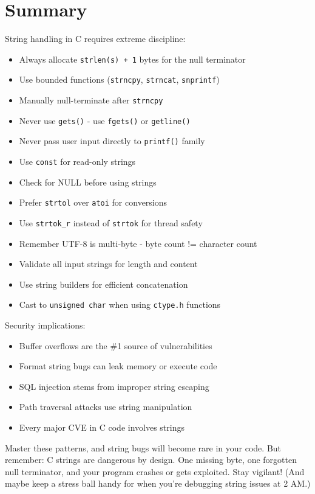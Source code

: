 \section{Summary}

String handling in C requires extreme discipline:

\begin{itemize}
    \item Always allocate \texttt{strlen(s) + 1} bytes for the null terminator
    \item Use bounded functions (\texttt{strncpy}, \texttt{strncat}, \texttt{snprintf})
    \item Manually null-terminate after \texttt{strncpy}
    \item Never use \texttt{gets()} - use \texttt{fgets()} or \texttt{getline()}
    \item Never pass user input directly to \texttt{printf()} family
    \item Use \texttt{const} for read-only strings
    \item Check for NULL before using strings
    \item Prefer \texttt{strtol} over \texttt{atoi} for conversions
    \item Use \texttt{strtok\_r} instead of \texttt{strtok} for thread safety
    \item Remember UTF-8 is multi-byte - byte count != character count
    \item Validate all input strings for length and content
    \item Use string builders for efficient concatenation
    \item Cast to \texttt{unsigned char} when using \texttt{ctype.h} functions
\end{itemize}

Security implications:

\begin{itemize}
    \item Buffer overflows are the \#1 source of vulnerabilities
    \item Format string bugs can leak memory or execute code
    \item SQL injection stems from improper string escaping
    \item Path traversal attacks use string manipulation
    \item Every major CVE in C code involves strings
\end{itemize}

Master these patterns, and string bugs will become rare in your code. But remember: C strings are dangerous by design. One missing byte, one forgotten null terminator, and your program crashes or gets exploited. Stay vigilant! (And maybe keep a stress ball handy for when you're debugging string issues at 2 AM.)

